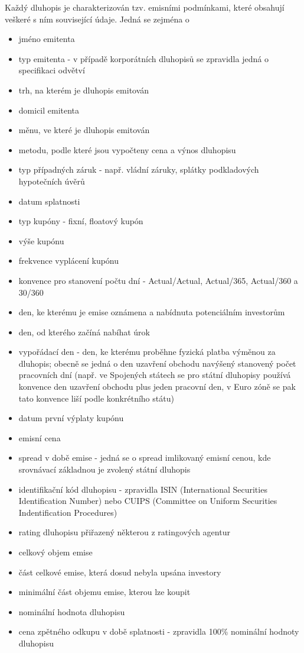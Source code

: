 \documentclass[a4paper]{book}
\begin{document}
Každý dluhopis je charakterizován tzv. emisními podmínkami, které obsahují veškeré s ním související údaje. Jedná se zejména o
\begin{itemize}
\item jméno emitenta
\item typ emitenta - v případě korporátních dluhopisů se zpravidla jedná o specifikaci odvětví
\item trh, na kterém je dluhopis emitován
\item domicil emitenta
\item měnu, ve které je dluhopis emitován
\item metodu, podle které jsou vypočteny cena a výnos dluhopisu
\item typ případných záruk - např. vládní záruky, splátky podkladových hypotečních úvěrů
\item datum splatnosti
\item typ kupóny - fixní, floatový kupón
\item výše kupónu
\item frekvence vyplácení kupónu
\item konvence pro stanovení počtu dní - Actual/Actual, Actual/365, Actual/360 a 30/360
\item den, ke kterému je emise oznámena a nabídnuta potenciálním investorům
\item den, od kterého začíná nabíhat úrok
\item vypořádací den - den, ke kterému proběhne fyzická platba výměnou za dluhopis; obecně se jedná o den uzavření obchodu navýšený stanovený počet pracovních dní (např. ve Spojených státech se pro státní dluhopisy používá konvence den uzavření obchodu plus jeden pracovní den, v Euro zóně se pak tato konvence liší podle konkrétního státu)
\item datum první výplaty kupónu
\item emisní cena
\item spread v době emise - jedná se o spread imlikovaný emisní cenou, kde srovnávací základnou je zvolený státní dluhopis
\item identifikační kód dluhopisu - zpravidla ISIN (International Securities Identification Number) nebo CUIPS (Committee on Uniform Securities Indentification Procedures)
\item rating dluhopisu přiřazený některou z ratingových agentur
\item celkový objem emise
\item část celkové emise, která dosud nebyla upsána investory
\item minimální část objemu emise, kterou lze koupit
\item nominální hodnota dluhopisu
\item cena zpětného odkupu v době splatnosti - zpravidla 100\% nominální hodnoty dluhopisu
\end{itemize}
\end{document}
